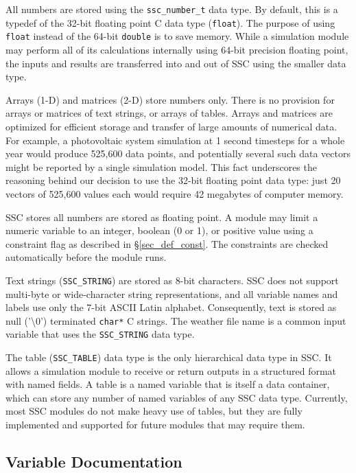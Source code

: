 \documentclass{scrartcl} %
\newcommand{\+}{\discretionary{\mbox{\scriptsize$\hookleftarrow$}}{}{}}
\begin{document}
All numbers are stored using the \texttt{ssc\_number\_t} data type.  By default, this is a typedef of the 32-bit floating point C data type (\texttt{float}).  The purpose of using \texttt{float} instead of the 64-bit \texttt{double} is to save memory.  While a simulation module may perform all of its calculations internally using 64-bit precision floating point, the inputs and results are transferred into and out of SSC using the smaller data type.

Arrays (1-D) and matrices (2-D) store numbers only. There is no provision for arrays or matrices of text strings, or arrays of tables.  Arrays and matrices are optimized for efficient storage and transfer of large amounts of numerical data.  For example, a photovoltaic system simulation at 1 second timesteps for a whole year would produce 525,600 data points, and potentially several such data vectors might be reported by a single simulation model.  This fact underscores the reasoning behind our decision to use the 32-bit floating point data type: just 20 vectors of 525,600 values each would require 42 megabytes of computer memory.

SSC stores all numbers are stored as floating point. A module may limit a numeric variable to an integer, boolean (0 or 1), or positive value using a constraint flag as described in \S\ref{sec_def_const}. The constraints are checked automatically before the module runs.

Text strings (\texttt{SSC\_STRING})  are stored as 8-bit characters.  SSC does not support multi-byte or wide-character string representations, and all variable names and labels use only the 7-bit ASCII Latin alphabet.  Consequently, text is stored as null ('\textbackslash 0') terminated \texttt{char*} C strings.  The weather file name is a common input variable that uses the \texttt{SSC\_STRING} data type.

The table (\texttt{SSC\_TABLE}) data type is the only hierarchical data type in SSC.  It allows a simulation module to receive or return outputs in a structured format with named fields.  A table is a named variable that is itself a data container, which can store any number of named variables of any SSC data type.  Currently, most SSC modules do not make heavy use of tables, but they are fully implemented and supported for future modules that may require them.

\subsection{Variable Documentation}
\label{sec_variable_docs}
\end{document}
